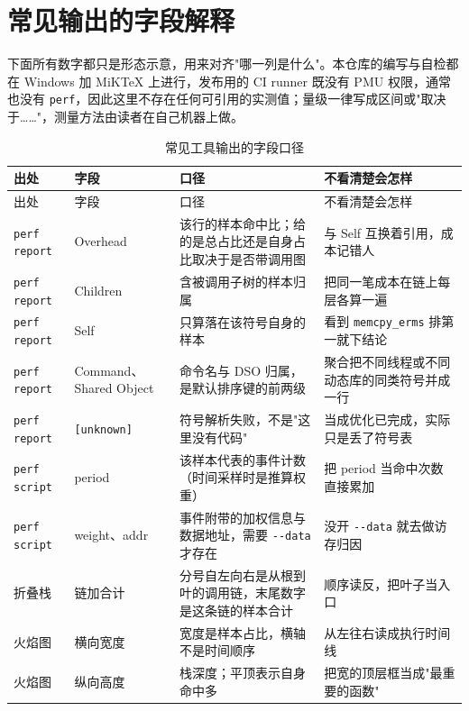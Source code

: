\documentclass[12pt,a4paper,fontset=fandol]{ctexbook}
\newcommand{\Tp}[1]{\texttt{#1}}
\newcommand{\Opt}[1]{\texttt{-\/-#1}}
\newcommand{\Bk}{\discretionary{}{}{}}
\begin{document}
\section{常见输出的字段解释}
\label{sec:pmapB-fields}

下面所有数字都只是形态示意，用来对齐"哪一列是什么"。本仓库的编写与自检都在 Windows 加 MiKTeX 上进行，发布用的 CI runner 既没有 PMU 权限，通常也没有 \Tp{perf}，因此这里不存在任何可引用的实测值；量级一律写成区间或"取决于……"，测量方法由读者在自己机器上做。

\begin{longtable}{>{\raggedright\arraybackslash}p{} >{\raggedright\arraybackslash}p{} >{\raggedright\arraybackslash}p{} >{\raggedright\arraybackslash}p{}}
\caption{常见工具输出的字段口径}\label{tab:pmapB-field}\\
\toprule
出处 & 字段 & 口径 & 不看清楚会怎样 \\
\midrule
\endfirsthead
\toprule
出处 & 字段 & 口径 & 不看清楚会怎样 \\
\midrule
\endhead
\bottomrule
\endlastfoot
\Tp{perf report} & Overhead & 该行的样本命中比；给的是总占比还是自身占比取决于是否带调用图 & 与 Self 互换着引用，成本记错人 \\
\Tp{perf report} & Children & 含被调用子树的样本归属 & 把同一笔成本在链上每层各算一遍 \\
\Tp{perf report} & Self & 只算落在该符号自身的样本 & 看到 \Tp{memcpy\_{\Bk}erms} 排第一就下结论 \\
\Tp{perf report} & Command、Shared Object & 命令名与 DSO 归属，是默认排序键的前两级 & 聚合把不同线程或不同动态库的同类符号并成一行 \\
\Tp{perf report} & \Tp{[unknown]} & 符号解析失败，不是"这里没有代码" & 当成优化已完成，实际只是丢了符号表 \\
\Tp{perf script} & period & 该样本代表的事件计数（时间采样时是推算权重） & 把 period 当命中次数直接累加 \\
\Tp{perf script} & weight、addr & 事件附带的加权信息与数据地址，需要 \Opt{data} 才存在 & 没开 \Opt{data} 就去做访存归因 \\
折叠栈 & 链加合计 & 分号自左向右是从根到叶的调用链，末尾数字是这条链的样本合计 & 顺序读反，把叶子当入口 \\
火焰图 & 横向宽度 & 宽度是样本占比，横轴不是时间顺序 & 从左往右读成执行时间线 \\
火焰图 & 纵向高度 & 栈深度；平顶表示自身命中多 & 把宽的顶层框当成"最重要的函数" \\

\end{longtable}
\end{document}
